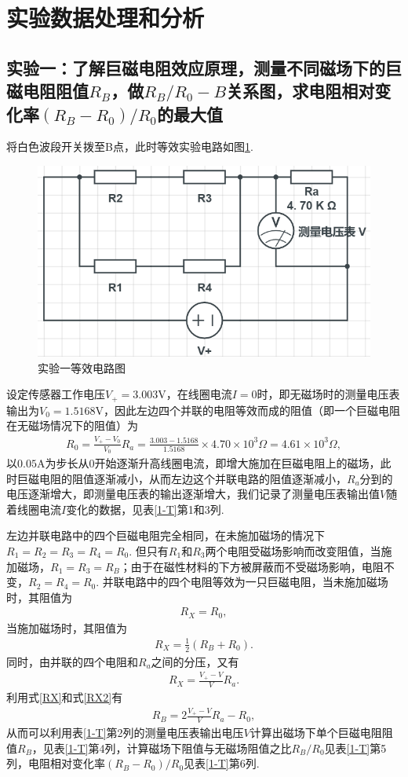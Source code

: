 \documentclass[UTF8,10pt,a4paper]{article}
\begin{document}
\thispagestyle{FirstPageStyle}
\section{实验数据处理和分析}
\subsection{实验一：了解巨磁电阻效应原理，测量不同磁场下的巨磁电阻阻值$R_B$，做$R_B/R_0-B$关系图，求电阻相对变化率$(R_B-R_0)/R_0$的最大值}

将白色波段开关拨至B点，此时等效实验电路如图\ref{circuit-1}.

\begin{figure}[h]
    \centering
    \includegraphics[width=.4\textwidth]{Circuit-1.png}
    \caption{实验一等效电路图}
    \label{circuit-1}
\end{figure}

设定传感器工作电压$V_+=3.003$V，在线圈电流$I=0$时，即无磁场时的测量电压表输出为$V_0=1.5168$V，因此左边四个并联的电阻等效而成的阻值（即一个巨磁电阻在无磁场情况下的阻值）为
\begin{align}
    R_0=\frac{V_+-V_0}{V_0}R_a=\frac{3.003-1.5168}{1.5168}\times 4.70\times 10^3\Omega=4.61\times 10^{3}\Omega,
\end{align}
以$0.05$A为步长从$0$开始逐渐升高线圈电流，即增大施加在巨磁电阻上的磁场，此时巨磁电阻的阻值逐渐减小，从而左边这个并联电路的阻值逐渐减小，$R_a$分到的电压逐渐增大，即测量电压表的输出逐渐增大，我们记录了测量电压表输出值$V$随着线圈电流$I$变化的数据，见表\ref{1-T}第1和3列.

左边并联电路中的四个巨磁电阻完全相同，在未施加磁场的情况下$R_1=R_2=R_3=R_4=R_0$. 但只有$R_1$和$R_3$两个电阻受磁场影响而改变阻值，当施加磁场，$R_1=R_3=R_B$；由于在磁性材料的下方被屏蔽而不受磁场影响，电阻不变，$R_2=R_4=R_0$. 并联电路中的四个电阻等效为一只巨磁电阻，当未施加磁场时，其阻值为
\begin{align}
    R_X=R_0,
\end{align}
当施加磁场时，其阻值为
\begin{align}
    \label{RX}
    R_X=\frac{1}{2}(R_B+R_0).
\end{align}
同时，由并联的四个电阻和$R_a$之间的分压，又有
\begin{align}
    \label{RX2}
    R_X=\frac{V_+-V}{V}R_a.
\end{align}
利用式\eqref{RX}和式\eqref{RX2}有
\begin{align}
    R_B=2\frac{V_+-V}{V}R_a-R_0,
\end{align}
从而可以利用表\ref{1-T}第2列的测量电压表输出电压$V$计算出磁场下单个巨磁电阻阻值$R_B$，见表\ref{1-T}第4列，计算磁场下阻值与无磁场阻值之比$R_B/R_0$见表\ref{1-T}第5列，电阻相对变化率$(R_B-R_0)/R_0$见表\ref{1-T}第6列.
\end{document}
